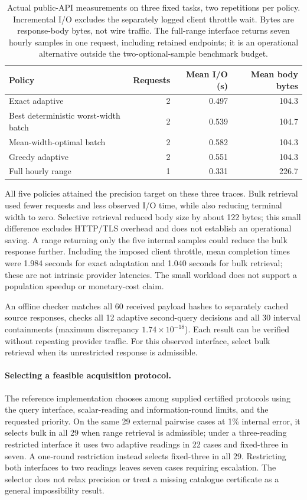 \begin{table}[htbp]\centering\small
\caption{Actual public-API measurements on three fixed tasks, two
repetitions per policy. Incremental I/O excludes the separately logged
client throttle wait. Bytes are response-body bytes, not wire traffic.
The full-range interface returns seven hourly samples in one request,
including retained endpoints; it is an operational alternative outside
the two-optional-sample benchmark budget.}\label{tab:actual-api}
\begin{tabular}{lrrr}\toprule
Policy & Requests & Mean I/O (s) & Mean body bytes\\\midrule
Exact adaptive & 2 & 0.497 & 104.3\\
Best deterministic worst-width batch & 2 & 0.539 & 104.7\\
Mean-width-optimal batch & 2 & 0.582 & 104.3\\
Greedy adaptive & 2 & 0.551 & 104.3\\
Full hourly range & 1 & 0.331 & 226.7\\\bottomrule
\end{tabular}\end{table}

All five policies attained the precision target on these three traces.
Bulk retrieval used fewer requests and less observed I/O time, while
also reducing terminal width to zero. Selective retrieval reduced body
size by about 122 bytes; this small difference excludes HTTP/TLS overhead
and does not establish an operational saving. A range returning only the
five internal samples could reduce the bulk response further. Including
the imposed client throttle, mean completion times were 1.984 seconds
for exact adaptation and 1.040 seconds for bulk retrieval; these are not
intrinsic provider latencies. The small workload does not support a
population speedup or monetary-cost claim.

An offline checker matches all 60 received payload hashes to separately
cached source responses, checks all 12 adaptive second-query decisions
and all 30 interval containments (maximum discrepancy
$1.74\times10^{-18}$). Each result can be verified without repeating
provider traffic. For this observed interface, select bulk retrieval when
its unrestricted response is admissible.
\FloatBarrier
\paragraph{Selecting a feasible acquisition protocol.}
The reference implementation chooses among supplied certified protocols
using the query interface, scalar-reading and information-round limits, and
the requested priority. On the same 29 external pairwise cases at 1\%
internal error, it selects bulk in all 29 when range retrieval is admissible;
under a three-reading restricted interface it uses two adaptive readings in
22 cases and fixed-three in seven. A one-round restriction instead selects
fixed-three in all 29. Restricting both interfaces to two readings leaves
seven cases requiring escalation. The selector does not relax precision or
treat a missing catalogue certificate as a general impossibility result.

